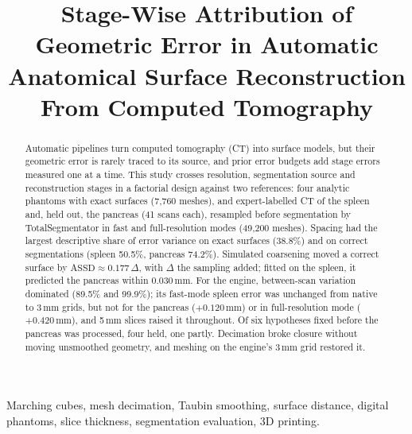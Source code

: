 \documentclass[conference]{IEEEtran}
\newcommand{\mm}{\,mm\xspace}
\begin{document}
\title{Stage-Wise Attribution of Geometric Error in Automatic Anatomical Surface Reconstruction From Computed Tomography}

\author{
\and
{}
}

\maketitle

\begin{abstract}
Automatic pipelines turn computed tomography (CT) into surface models, but their geometric error is rarely traced to its source, and prior error budgets add stage errors measured one at a time. This study crosses resolution, segmentation source and reconstruction stages in a factorial design against two references: four analytic phantoms with exact surfaces (7{,}760 meshes), and expert-labelled CT of the spleen and, held out, the pancreas (41 scans each), resampled before segmentation by TotalSegmentator in fast and full-resolution modes (49{,}200 meshes). Spacing had the largest descriptive share of error variance on exact surfaces (38.8\%) and on correct segmentations (spleen 50.5\%, pancreas 74.2\%). Simulated coarsening moved a correct surface by $\text{ASSD}\approx0.177\,\Delta$, with $\Delta$ the sampling added; fitted on the spleen, it predicted the pancreas within 0.030\mm. For the engine, between-scan variation dominated (89.5\% and 99.9\%); its fast-mode spleen error was unchanged from native to 3\mm grids, but not for the pancreas ($+0.120$\mm) or in full-resolution mode ($+0.420$\mm), and 5\mm slices raised it throughout. Of six hypotheses fixed before the pancreas was processed, four held, one partly. Decimation broke closure without moving unsmoothed geometry, and meshing on the engine's 3\mm grid restored it.
\end{abstract}

\begin{IEEEkeywords}
Marching cubes, mesh decimation, Taubin smoothing, surface distance, digital phantoms, slice thickness, segmentation evaluation, 3D printing.
\end{IEEEkeywords}

\end{document}
